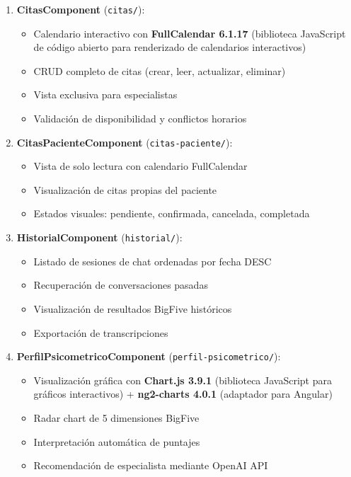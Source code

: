 \documentclass[12pt,a4paper]{report}
\numberwithin{figure}{section}
\begin{document}
\begin{enumerate}
  \item \textbf{CitasComponent} (\texttt{citas/}):
  \begin{itemize}
    \item Calendario interactivo con \textbf{FullCalendar 6.1.17} (biblioteca JavaScript de código abierto para renderizado de calendarios interactivos)
    \item CRUD completo de citas (crear, leer, actualizar, eliminar)
    \item Vista exclusiva para especialistas
    \item Validación de disponibilidad y conflictos horarios
  \end{itemize}
  
  \item \textbf{CitasPacienteComponent} (\texttt{citas-paciente/}):
  \begin{itemize}
    \item Vista de solo lectura con calendario FullCalendar
    \item Visualización de citas propias del paciente
    \item Estados visuales: pendiente, confirmada, cancelada, completada
  \end{itemize}
  
  \item \textbf{HistorialComponent} (\texttt{historial/}):
  \begin{itemize}
    \item Listado de sesiones de chat ordenadas por fecha DESC
    \item Recuperación de conversaciones pasadas
    \item Visualización de resultados BigFive históricos
    \item Exportación de transcripciones
  \end{itemize}
  
  \item \textbf{PerfilPsicometricoComponent} (\texttt{perfil-psicometrico/}):
  \begin{itemize}
    \item Visualización gráfica con \textbf{Chart.js 3.9.1} (biblioteca JavaScript para gráficos interactivos) + \textbf{ng2-charts 4.0.1} (adaptador para Angular)
    \item Radar chart de 5 dimensiones BigFive
    \item Interpretación automática de puntajes
    \item Recomendación de especialista mediante OpenAI API
  \end{itemize}
  

\end{enumerate}
\end{document}
